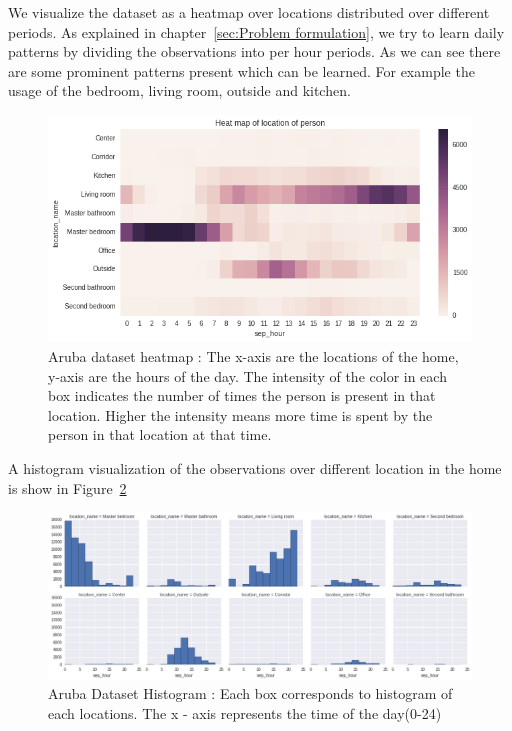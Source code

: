 We visualize the dataset as a heatmap over locations distributed over different periods. As explained in chapter~\ref{sec:Problem formulation}, we try to learn daily patterns by dividing the observations into per hour periods. As we can see there are some prominent patterns present which can be learned. For example the usage of the bedroom, living room, outside and kitchen.

\begin{figure}[htp]
\centering
\includegraphics[width=\textwidth]{images/aruba-data.png}
\caption[Aruba dataset heatmap]{Aruba dataset heatmap : The x-axis are the locations of the home, y-axis are the hours of the day. The intensity of the color in each box indicates the number of times the person is present in that location. Higher the intensity means more time is spent by the person in that location at that time.}
\label{aruba-visual}
\end{figure}

A histogram visualization of the observations over different location in the home is show in Figure~\ref{aruba-hist}

\begin{figure}[htp]
\centering
\includegraphics[width=\textwidth]{images/aruba-hist.png}
\caption[Aruba dataset histogram]{Aruba Dataset Histogram : Each box corresponds to histogram of each locations. The x - axis represents the time of the day(0-24) }
\label{aruba-hist}
\end{figure}


